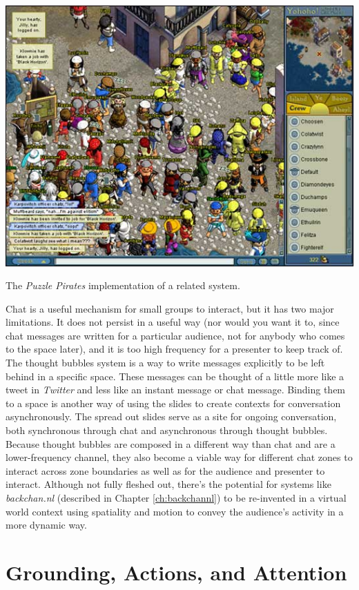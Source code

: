 \begin{marginfigure}
	\includegraphics{figures/pp_circles_chat.jpeg}
	\caption{The \emph{Puzzle Pirates} implementation of a related system.}
	\label{fig:pp_chat_circles}
\end{marginfigure}

Chat is a useful mechanism for small groups to interact, but it has two major limitations. It does not persist in a useful way (nor would you want it to, since chat messages are written for a particular audience, not for anybody who comes to the space later), and it is too high frequency for a presenter to keep track of. The thought bubbles system is a way to write messages explicitly to be left behind in a specific space. These messages can be thought of a little more like a tweet in \emph{Twitter} and less like an instant message or chat message. Binding them to a space is another way of using the slides to create contexts for conversation asynchronously. The spread out slides serve as a site for ongoing conversation, both synchronous through chat and asynchronous through thought bubbles. Because thought bubbles are composed in a different way than chat and are a lower-frequency channel, they also become a viable way for different chat zones to interact across zone boundaries as well as for the audience and presenter to interact. Although not fully fleshed out, there's the potential for systems like \emph{backchan.nl} (described in Chapter \ref{ch:backchannl}) to be re-invented in a virtual world context using spatiality and motion to convey the audience's activity in a more dynamic way.


\section{Grounding, Actions, and Attention}

